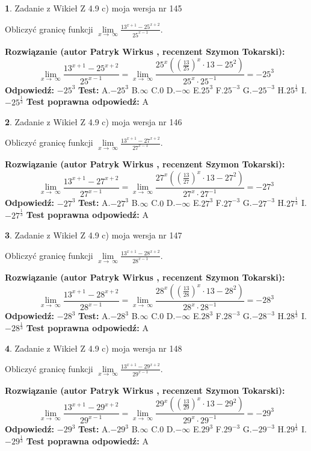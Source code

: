 \documentclass[12pt, a4paper]{article}
\theoremstyle{definition} %
\newtheorem{zad}{}
\newcommand{\zadStart}[1]{\begin{zad}#1\newline}
\newcommand{\zadStop}{\end{zad}}
\newcommand{\rozwStart}[2]{\noindent \textbf{Rozwiązanie (autor #1 , recenzent #2): }\newline}
\newcommand{\rozwStop}{\newline}
\newcommand{\odpStart}{\noindent \textbf{Odpowiedź:}\newline}
\newcommand{\odpStop}{\newline}
\newcommand{\testStart}{\noindent \textbf{Test:}\newline}
\newcommand{\testStop}{\newline}
\newcommand{\kluczStart}{\noindent \textbf{Test poprawna odpowiedź:}\newline}
\newcommand{\kluczStop}{\newline}
\begin{document}
\zadStart{Zadanie z Wikieł Z 4.9 c) moja wersja nr 145}


Obliczyć granicę funkcji  $\lim\limits_{x\to\ \infty}\frac{13^{x+1}-25^{x+2}}{25^{x-1}}$.
\zadStop
\rozwStart{Patryk Wirkus}{Szymon Tokarski}
$$\lim\limits_{x\to\ \infty}\frac{13^{x+1}-25^{x+2}}{25^{x-1}}=\lim\limits_{x\to\ \infty}\frac{25^{x}((\frac{13}{25})^{x}\cdot 13 -25^{2})}{25^{x}\cdot 25^{-1}} = -25^{3}$$
\rozwStop
\odpStart
$-25^{3}$
\odpStop
\testStart
A.$-25^{3}$ B.$\infty$ C.$0$ D.$-\infty$ E.$25^{3}$
F.$25^{-3}$ G.$-25^{-3}$
H.$25^{\frac{1}{3}}$
I.$-25^{\frac{1}{3}}$
\testStop
\kluczStart
A
\kluczStop



\zadStart{Zadanie z Wikieł Z 4.9 c) moja wersja nr 146}


Obliczyć granicę funkcji  $\lim\limits_{x\to\ \infty}\frac{13^{x+1}-27^{x+2}}{27^{x-1}}$.
\zadStop
\rozwStart{Patryk Wirkus}{Szymon Tokarski}
$$\lim\limits_{x\to\ \infty}\frac{13^{x+1}-27^{x+2}}{27^{x-1}}=\lim\limits_{x\to\ \infty}\frac{27^{x}((\frac{13}{27})^{x}\cdot 13 -27^{2})}{27^{x}\cdot 27^{-1}} = -27^{3}$$
\rozwStop
\odpStart
$-27^{3}$
\odpStop
\testStart
A.$-27^{3}$ B.$\infty$ C.$0$ D.$-\infty$ E.$27^{3}$
F.$27^{-3}$ G.$-27^{-3}$
H.$27^{\frac{1}{3}}$
I.$-27^{\frac{1}{3}}$
\testStop
\kluczStart
A
\kluczStop



\zadStart{Zadanie z Wikieł Z 4.9 c) moja wersja nr 147}


Obliczyć granicę funkcji  $\lim\limits_{x\to\ \infty}\frac{13^{x+1}-28^{x+2}}{28^{x-1}}$.
\zadStop
\rozwStart{Patryk Wirkus}{Szymon Tokarski}
$$\lim\limits_{x\to\ \infty}\frac{13^{x+1}-28^{x+2}}{28^{x-1}}=\lim\limits_{x\to\ \infty}\frac{28^{x}((\frac{13}{28})^{x}\cdot 13 -28^{2})}{28^{x}\cdot 28^{-1}} = -28^{3}$$
\rozwStop
\odpStart
$-28^{3}$
\odpStop
\testStart
A.$-28^{3}$ B.$\infty$ C.$0$ D.$-\infty$ E.$28^{3}$
F.$28^{-3}$ G.$-28^{-3}$
H.$28^{\frac{1}{3}}$
I.$-28^{\frac{1}{3}}$
\testStop
\kluczStart
A
\kluczStop



\zadStart{Zadanie z Wikieł Z 4.9 c) moja wersja nr 148}


Obliczyć granicę funkcji  $\lim\limits_{x\to\ \infty}\frac{13^{x+1}-29^{x+2}}{29^{x-1}}$.
\zadStop
\rozwStart{Patryk Wirkus}{Szymon Tokarski}
$$\lim\limits_{x\to\ \infty}\frac{13^{x+1}-29^{x+2}}{29^{x-1}}=\lim\limits_{x\to\ \infty}\frac{29^{x}((\frac{13}{29})^{x}\cdot 13 -29^{2})}{29^{x}\cdot 29^{-1}} = -29^{3}$$
\rozwStop
\odpStart
$-29^{3}$
\odpStop
\testStart
A.$-29^{3}$ B.$\infty$ C.$0$ D.$-\infty$ E.$29^{3}$
F.$29^{-3}$ G.$-29^{-3}$
H.$29^{\frac{1}{3}}$
I.$-29^{\frac{1}{3}}$
\testStop
\kluczStart
A
\kluczStop
\end{document}
